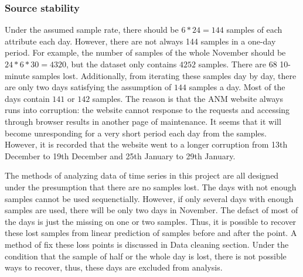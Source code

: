 \documentclass[12pt,a4paper]{report}
\begin{document}
                \subsubsection{Source stability}
                \label{text_source_stability}
                Under the assumed sample rate, there should be $6*24=144$ samples of each attribute each day. However, there are not always 144 samples in a one-day period.
                For example, the number of samples of the whole November should be $24*6*30=4320$, but the dataset only contains $4252$ samples. There are $68$ 10-minute samples
                lost. Additionally, from iterating these samples day by day, there are only two days satisfying the assumption of $144$ samples a day. Most of the days contain
                $141$ or $142$ samples. The reason is that the ANM website always runs into corruption: the website cannot response to the requests and accessing through browser results
                in another page of maintenance. It seems that it will become unresponding for a very short period each day from the samples. However, it is recorded that the website
                went to a longer corruption from 13th December to 19th December and 25th January to 29th January.

                The methods of analyzing data of time series in this project are all designed under the presumption that there are no samples lost. The days with not enough samples cannot be
                used sequenctially. However, if only several days with enough samples are used, there will be only two days in November. The defact of most of the days is just the missing on
                one or two samples. Thus, it is possible to recover these lost samples from linear prediction of samples before and after the point. A method of fix these loss points is discussed
                in Data cleaning section. Under the condition that the sample of half or the whole day is lost, there is not possible ways to recover, thus, these days are excluded from
                analysis.
            
                
        
\end{document}
